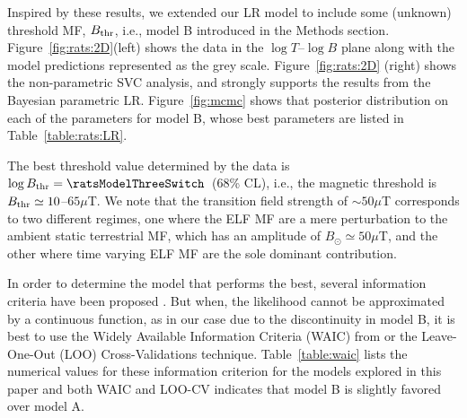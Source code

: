 \documentclass[letter,twoside]{article}
\begin{document}
 
Inspired by these results, we extended our LR model  to include  some (unknown) threshold MF, $B_{\rm thr}$, i.e., model B introduced in the Methods section. Figure~\ref{fig:rats:2D}(left) shows the data in the $\log T$--$\log B$ plane along with the model predictions represented as the grey scale. 
Figure~\ref{fig:rats:2D} (right) shows  the non-parametric SVC analysis, and strongly supports the results from the Bayesian parametric LR.
 Figure~\ref{fig:mcmc} shows that posterior distribution on each of the parameters for model B, whose best parameters are listed in Table~\ref{table:rats:LR}. 
 
 The best threshold value determined by the data is $\log B_{\rm thr}=\ratsModelThreeSwitch$\ratsModelThreeSwitchErr\ (68\% CL), i.e., the magnetic threshold is $B_{\rm thr}\simeq10$--$65\mu$T. %
 We note that the transition field  strength of $\sim50\mu$T   corresponds to
two different regimes, one where the ELF MF are a mere perturbation to the ambient static terrestrial MF, which has
an amplitude of $B_{\odot}\simeq50\mu$T, and the other where time varying ELF MF are the sole dominant contribution.  
 
In order to determine the model that performs the best, several information criteria have been proposed \citep[see review in][]{Gelman2014}. But when, the likelihood cannot be approximated by a continuous function, as in our case due to the discontinuity
in model B, it is best to use the Widely Available
Information Criteria (WAIC) from \citet{Watanabe2010, Watanabe2013}
or the Leave-One-Out (LOO) Cross-Validations \citep{Vehtari2016} technique.
Table~\ref{table:waic} lists the numerical values for these information
criterion for the models explored in this paper and both WAIC and LOO-CV indicates that model B is slightly favored over model A.
\end{document}
